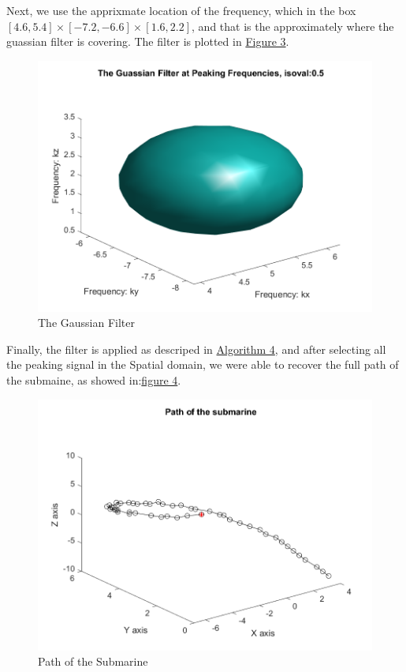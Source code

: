 \documentclass{article}
\begin{document}
    Next, we use the apprixmate location of the frequency, which in the box $[4.6, 5.4]\times [-7.2, -6.6]\times[1.6, 2.2]$, and that is the approximately where the guassian filter is covering. The filter is plotted in \hyperref[fig:guass-filter]{Figure 3}. 
    \begin{figure}[h]
        \centering
        \includegraphics*[width=0.5\linewidth]{gaussian-filter.png}
        \caption{The Gaussian Filter}
        \label{fig:guass-filter}
    \end{figure}
    Finally, the filter is applied as descriped in \hyperref[alg:algorithm4]{Algorithm 4}, and after selecting all the peaking signal in the Spatial domain, we were able to recover the full path of the submaine, as showed in:\hyperref[fig:path]{figure 4}. 
    \begin{figure}[h]
        \includegraphics*[width=0.7\linewidth]{submarine-path.png}
        \caption{Path of the Submarine}
        \label{fig:path}
        \centering
    \end{figure}
\end{document}
